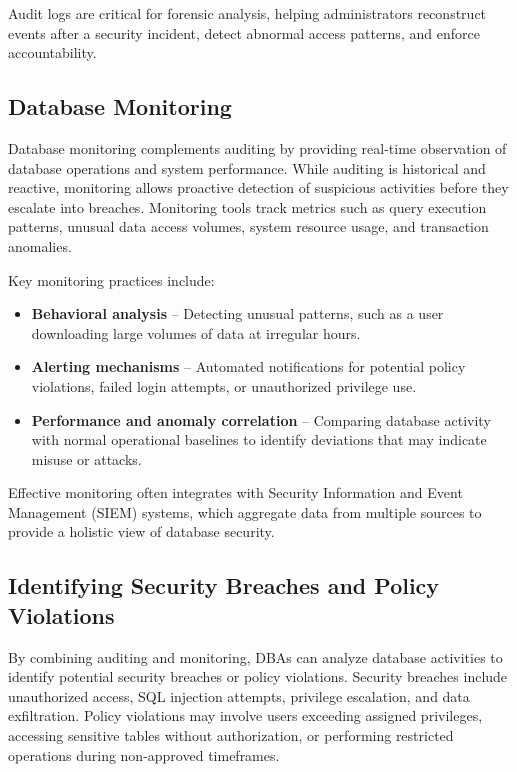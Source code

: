 \documentclass[12pt,a4paper]{article}
\begin{document}
Audit logs are critical for forensic analysis, helping administrators reconstruct events after a security incident, detect abnormal access patterns, and enforce accountability.

\subsection{Database Monitoring}

Database monitoring complements auditing by providing real-time observation of database operations and system performance. While auditing is historical and reactive, monitoring allows proactive detection of suspicious activities before they escalate into breaches. Monitoring tools track metrics such as query execution patterns, unusual data access volumes, system resource usage, and transaction anomalies.

Key monitoring practices include:

\begin{itemize}
  \item \textbf{Behavioral analysis} -- Detecting unusual patterns, such as a user downloading large volumes of data at irregular hours.
  \item \textbf{Alerting mechanisms} -- Automated notifications for potential policy violations, failed login attempts, or unauthorized privilege use.
  \item \textbf{Performance and anomaly correlation} -- Comparing database activity with normal operational baselines to identify deviations that may indicate misuse or attacks.
\end{itemize}

Effective monitoring often integrates with Security Information and Event Management (SIEM) systems, which aggregate data from multiple sources to provide a holistic view of database security.

\subsection{Identifying Security Breaches and Policy Violations}

By combining auditing and monitoring, DBAs can analyze database activities to identify potential security breaches or policy violations. Security breaches include unauthorized access, SQL injection attempts, privilege escalation, and data exfiltration. Policy violations may involve users exceeding assigned privileges, accessing sensitive tables without authorization, or performing restricted operations during non-approved timeframes.
\end{document}
